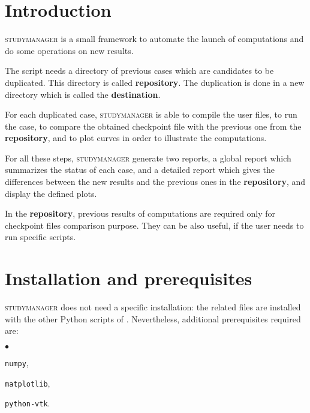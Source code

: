 \documentclass[a4paper,10pt,twoside]{csshortdoc}
\begin{document}
\def\contentsname{\textbf{\normalsize TABLE OF CONTENTS}\pdfbookmark[1]{Table of
contents}{contents}}

\renewcommand{\logocs}{cs_logo_wave}

\large
\makepdgCS
\normalsize

\passepage

\begin{center}\begin{singlespace}
\tableofcontents
\end{singlespace}\end{center}
%
\section{Introduction}

\textsc{studymanager} is a small framework to automate the launch of \CS
computations and do some operations on new results.

The script needs a directory of previous \CS cases which are candidates to be
duplicated. This directory is called \textbf{repository}. The duplication is
done in a new directory which is called the \textbf{destination}.

For each duplicated case, \textsc{studymanager} is able to compile the user
files, to run the case, to compare the obtained checkpoint file with the
previous one from the \textbf{repository}, and to plot curves in order to
illustrate the computations.

For all these steps, \textsc{studymanager} generate two reports,
a global report which summarizes the status of each case, and a detailed report
which gives the
differences between the new results and the previous ones in the
\textbf{repository}, and display the defined plots.

In the \textbf{repository}, previous results of computations are required only
for checkpoint files comparison purpose. They can be also useful, if the user
needs to run specific scripts.

\section{Installation and prerequisites}

\textsc{studymanager} does not need a specific installation: the related files
are installed with the other Python scripts of \CS. Nevertheless, additional
prerequisites required are:
\begin{list}{$\bullet$}{}
\item \texttt{numpy},
\item \texttt{matplotlib},
\item \texttt{python-vtk}.
\end{list}
\end{document}
